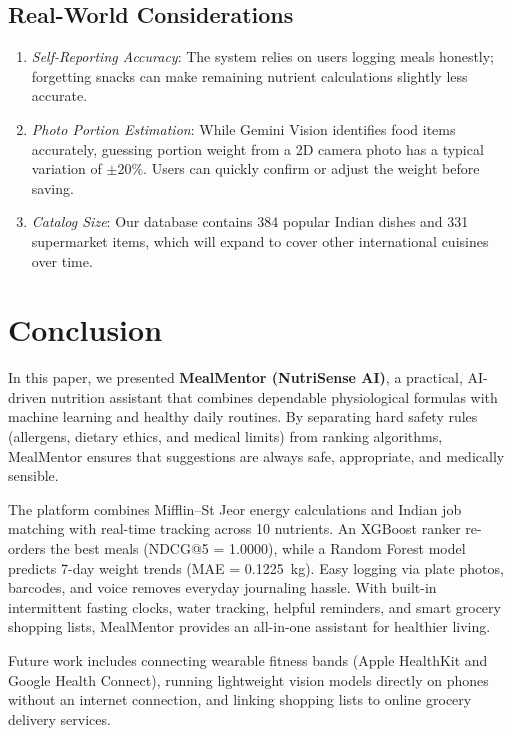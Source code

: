 \documentclass[10pt, conference, letterpaper]{IEEEtran}
\begin{document}
\subsection{Real-World Considerations}
\begin{enumerate}[leftmargin=*, nosep]
    \item \textit{Self-Reporting Accuracy}: The system relies on users logging meals honestly; forgetting snacks can make remaining nutrient calculations slightly less accurate.
    \item \textit{Photo Portion Estimation}: While Gemini Vision identifies food items accurately, guessing portion weight from a 2D camera photo has a typical variation of $\pm 20\%$. Users can quickly confirm or adjust the weight before saving.
    \item \textit{Catalog Size}: Our database contains 384 popular Indian dishes and 331 supermarket items, which will expand to cover other international cuisines over time.
\end{enumerate}

\section{Conclusion}
In this paper, we presented \textbf{MealMentor (NutriSense AI)}, a practical, AI-driven nutrition assistant that combines dependable physiological formulas with machine learning and healthy daily routines. By separating hard safety rules (allergens, dietary ethics, and medical limits) from ranking algorithms, MealMentor ensures that suggestions are always safe, appropriate, and medically sensible.

The platform combines Mifflin--St Jeor energy calculations and Indian job matching with real-time tracking across 10 nutrients. An XGBoost ranker re-orders the best meals (NDCG@5 = 1.0000), while a Random Forest model predicts 7-day weight trends (MAE = 0.1225~kg). Easy logging via plate photos, barcodes, and voice removes everyday journaling hassle. With built-in intermittent fasting clocks, water tracking, helpful reminders, and smart grocery shopping lists, MealMentor provides an all-in-one assistant for healthier living.

Future work includes connecting wearable fitness bands (Apple HealthKit and Google Health Connect), running lightweight vision models directly on phones without an internet connection, and linking shopping lists to online grocery delivery services.
\end{document}
